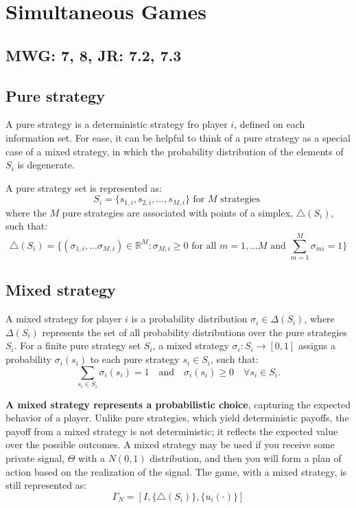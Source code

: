 \documentclass{article}
\begin{document}
\section{Simultaneous Games}
\subsection*{MWG: 7, 8, JR: 7.2, 7.3}

\subsection{Pure strategy}

A pure strategy is a deterministic strategy fro player $i$, defined on each information set. For ease, it can be helpful to think of a pure strategy as a special case of a mixed strategy, in which the probability distribution of the elements of $S_i$ is degenerate. 

A pure strategy set is represented as: \[
S_i = \{ s_{1,i}, s_{2,i},..., s_{M,i}\} \text{ for } M \text{ strategies }
\]
where the $M$ pure strategies are associated with points of a simplex, $\triangle(S_i)$, such that: \[
\triangle(S_i) = \{(\sigma_{1,i},...\sigma_{M,i}) \in \mathbb{R}^M : \sigma_{M,i} \geq 0 \text{ for all } m = 1,...M \text{ and } \sum^{M}_{m=1} \sigma_{mi} = 1 \}
\]


\subsection{Mixed strategy}
A mixed strategy for player \(i\) is a probability distribution \(\sigma_i \in \Delta(S_i)\), where \(\Delta(S_i)\) represents the set of all probability distributions over the pure strategies \(S_i\). For a finite pure strategy set \(S_i\), a mixed strategy \(\sigma_i : S_i \to [0, 1]\) assigns a probability \(\sigma_i(s_i)\) to each pure strategy \(s_i \in S_i\), such that:
\[
\sum_{s_i \in S_i} \sigma_i(s_i) = 1 \quad \text{and} \quad \sigma_i(s_i) \geq 0 \quad \forall s_i \in S_i.
\]

\noindent \textbf{A mixed strategy represents a probabilistic choice}, capturing the expected behavior of a player. Unlike pure strategies, which yield deterministic payoffs, the payoff from a mixed strategy is not deterministic; it reflects the expected value over the possible outcomes. A mixed strategy may be used if you receive some private signal, $\Theta$ with a $N(0,1)$ distribution, and then you will form a plan of action based on the realization of the signal. The game, with a mixed strategy, is still represented as: \[
\Gamma_{N} = [I, \{\triangle(S_i)\}, \{u_i(\cdot)\}]
\]
\end{document}
